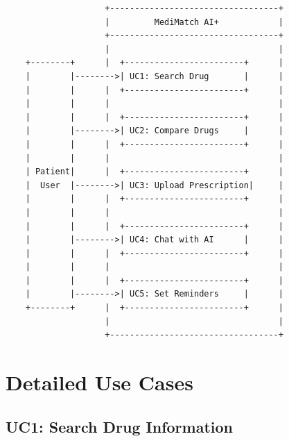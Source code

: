 \documentclass[12pt,a4paper]{report}
\begin{document}
\begin{verbatim}
                    +----------------------------------+
                    |         MediMatch AI+            |
                    +----------------------------------+
                    |                                  |
    +--------+      |  +------------------------+      |
    |        |-------->| UC1: Search Drug       |      |
    |        |      |  +------------------------+      |
    |        |      |                                  |
    |        |      |  +------------------------+      |
    |        |-------->| UC2: Compare Drugs     |      |
    |        |      |  +------------------------+      |
    |        |      |                                  |
    | Patient|      |  +------------------------+      |
    |  User  |-------->| UC3: Upload Prescription|     |
    |        |      |  +------------------------+      |
    |        |      |                                  |
    |        |      |  +------------------------+      |
    |        |-------->| UC4: Chat with AI      |      |
    |        |      |  +------------------------+      |
    |        |      |                                  |
    |        |      |  +------------------------+      |
    |        |-------->| UC5: Set Reminders     |      |
    +--------+      |  +------------------------+      |
                    |                                  |
                    +----------------------------------+
\end{verbatim}

\section{Detailed Use Cases}

\subsection{UC1: Search Drug Information}
\end{document}
